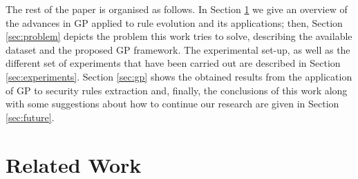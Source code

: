 \documentclass[a4paper,10pt,twocolumn,preprint,3p]{elsarticle}
\begin{document}

The rest of the paper is organised as follows. In Section \ref{sec:SotA} we give an overview of the advances in GP applied to rule evolution and its applications; then, Section \ref{sec:problem} depicts the problem this work tries to solve, describing the available dataset and the proposed GP framework. The experimental set-up, as well as the different set of experiments that have been carried out are described in Section \ref{sec:experiments}. Section \ref{sec:gp} shows the obtained results from the application of GP to security rules extraction and, finally, the conclusions of this work along with some suggestions about how to continue our research are given in Section \ref{sec:future}.  

\section{Related Work}
\label{sec:SotA}

\end{document}
